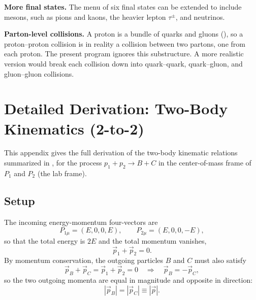 \documentclass{article}
\begin{document}
\par\textbf{More final states.} The menu of six final states can be extended to include mesons, such as pions and kaons, the heavier lepton $\tau^\pm$, and neutrinos.

\par\textbf{Parton-level collisions.} A proton is a bundle of quarks and gluons (), so a proton--proton collision is in reality a collision between two partons, one from each proton. The present program ignores this substructure. A more realistic version would break each collision down into quark--quark, quark--gluon, and gluon--gluon collisions.

\newpage
\appendix
\section{Detailed Derivation: Two-Body Kinematics (2-to-2)}
\label{app:2to2}
This appendix gives the full derivation of the two-body kinematic relations summarized in , for the process $p_1 + p_2 \rightarrow B + C$ in the center-of-mass frame of $P_1$ and $P_2$ (the lab frame).

\subsection{Setup}
The incoming energy-momentum four-vectors are
\begin{equation}
    P_{1\mu} = (E, 0, 0, E), \qquad P_{2\mu} = (E, 0, 0, -E),
\end{equation}
so that the total energy is $2E$ and the total momentum vanishes,
\begin{equation}
    \vec{p}_1 + \vec{p}_2 = 0.
\end{equation}
By momentum conservation, the outgoing particles $B$ and $C$ must also satisfy
\begin{equation}
    \vec{p}_B + \vec{p}_C = \vec{p}_1 + \vec{p}_2 = 0 \quad \Rightarrow \quad \vec{p}_B = -\vec{p}_C,
\end{equation}
so the two outgoing momenta are equal in magnitude and opposite in direction:
\begin{equation}
    |\vec{p}_B| = |\vec{p}_C| \equiv |\vec{p}|.
\end{equation}
\end{document}
